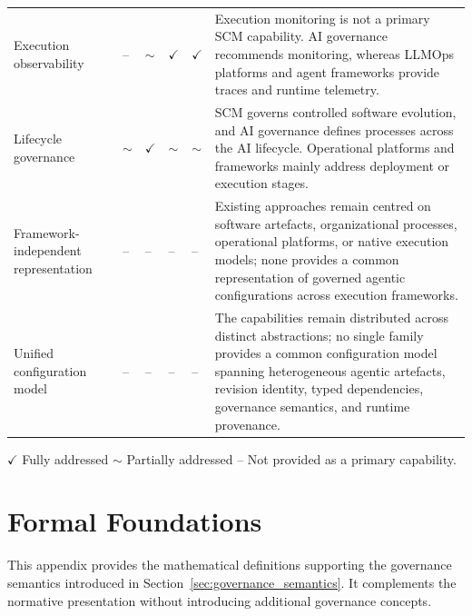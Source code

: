\documentclass[10pt]{article}
\begin{document}
\begin{table}[t]
\begin{tabularx}{\textwidth}{
			>{\RaggedRight\arraybackslash}p{3.25cm}
			C{1.05cm} 
			C{1.15cm} 
			C{1.45cm} 
			C{1.30cm} 
			Y
		}
		Execution observability
		&
		--
		&
		$\sim$
		&
		$\checkmark$
		&
		$\checkmark$
		&
		Execution monitoring is not a primary SCM capability.
		AI governance recommends monitoring, whereas LLMOps platforms and agent frameworks provide traces and runtime telemetry.
		\\
		
		Lifecycle governance
		&
		$\sim$
		&
		$\checkmark$
		&
		$\sim$
		&
		$\sim$
		&
		SCM governs controlled software evolution, and AI governance defines processes across the AI lifecycle. Operational platforms and frameworks mainly address deployment or
		execution stages.
		\\
		
		Framework-independent representation
		&
		--
		&
		--
		&
		--
		&
		--
		&
		Existing approaches remain centred on software artefacts, organizational processes, operational platforms, or native execution models; none provides a common representation of governed agentic configurations across execution frameworks.
		\\
		
		Unified configuration model
		&
		--
		&
		--
		&
		--
		&
		--
		&
		The capabilities remain distributed across distinct abstractions; no single family provides a common configuration model spanning heterogeneous agentic artefacts, revision identity, typed dependencies, governance semantics, and runtime provenance.
		\\
		
		\bottomrule
	\end{tabularx}
	
	\vspace{0.4em}
	
	{\scriptsize
		$\checkmark$ Fully addressed
		\hspace{1em}
		$\sim$ Partially addressed
		\hspace{1em}
		-- Not provided as a primary capability.
	}
	
\end{table}
	

\section{Formal Foundations}
\label{appendix:formal_foundations}

This appendix provides the mathematical definitions supporting the governance semantics introduced in Section~\ref{sec:governance_semantics}. It complements the normative presentation without introducing additional governance concepts.
\end{document}
